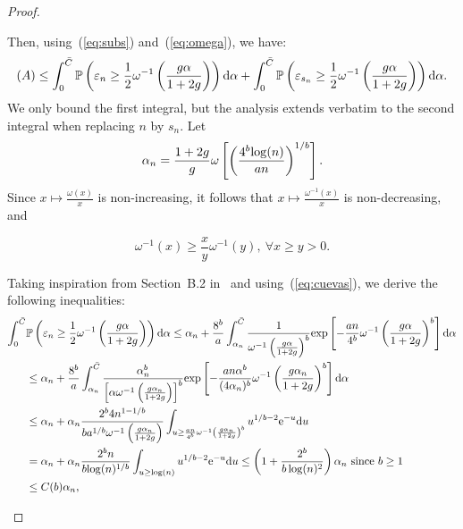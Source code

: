 \begin{proof}
\begin{itemize}
Then, using~(\ref{eq:subs}) and~(\ref{eq:omega}), we have:
$$(A)\leq \int_0^{\bar C} \mathbb{P}\left(\varepsilon_n\geq\frac{1}{2}\omega^{-1}\left(\frac{g\alpha}{1+2g}\right)\right){\rm d}\alpha
+ \int_0^{\bar C} \mathbb{P}\left(\varepsilon_{s_n}\geq\frac{1}{2}\omega^{-1}\left(\frac{g\alpha}{1+2g}\right)\right){\rm d}\alpha.$$
We only bound the first integral, but the analysis extends verbatim to the second integral when replacing $n$ by $s_n$.
Let $$\alpha_n=\frac{1+2g}{g}\omega\left[\left(\frac{4^b{\log}(n)}{an}\right)^{1/b}\right].$$
Since $x\mapsto\frac{\omega(x)}{x}$ is non-increasing, it follows that $x\mapsto\frac{\omega^{-1}(x)}{x}$ is non-decreasing, and 

\begin{equation}\label{eq:incrdecr}
\omega^{-1}(x)\geq\frac{x}{y}\omega^{-1}(y),\ \forall x\geq y >0.
\end{equation}

Taking inspiration from Section~B.2 in~\cite{Chazal13c} and using~(\ref{eq:cuevas}), we derive the following inequalities:
\begin{align}
\int_0^{\bar C} &\mathbb{P}\left(\varepsilon_n\geq\frac{1}{2}\omega^{-1}\left(\frac{g\alpha}{1+2g}\right)\right){\rm d}\alpha
\leq \alpha_n + \frac{8^b}{a}\int_{\alpha_n}^{\bar C}\frac{1}{\omega^{-1}\left(\frac{g\alpha}{1+2g}\right)^{b}}
{\rm exp}\left[-\frac{an}{4^b}\omega^{-1}\left(\frac{g\alpha}{1+2g}\right)^{b}\right]{\rm d}\alpha \nonumber \\
&\leq \alpha_n + \frac{8^b}{a}\int_{\alpha_n}^{\bar C}\frac{\alpha_n^b}{\left[\alpha\omega^{-1}\left(\frac{g\alpha_n}{1+2g}\right)\right]^{b}}
{\rm exp}\left[-\frac{an\alpha^b}{(4\alpha_n)^b}\omega^{-1}\left(\frac{g\alpha_n}{1+2g}\right)^{b}\right]{\rm d}\alpha \nonumber \\
&\leq\alpha_n + \alpha_n\frac{2^b 4n^{1-1/b}}{b a^{1/b}  \omega^{-1}\left(\frac{g\alpha_n}{1+2g}\right)}
\int_{u\geq \frac{an}{4^b}\omega^{-1}\left(\frac{g\alpha_n}{1+2g}\right)^b} u^{1/b-2}{\rm e}^{-u}{\rm d}u \nonumber \\
&= \alpha_n + \alpha_n\frac{ 2^b n }{ b{\log}(n)^{1/b}}
\int_{u\geq {\log}(n)} u^{1/b-2}{\rm e}^{-u}{\rm d}u \leq\left(1+\frac{2^b}{b\log(n)^2}\right)\alpha_n\text{ since }b\geq 1\nonumber \\
&\leq C(b)\alpha_n, \nonumber
\end{align}


\end{itemize}
\end{proof}
